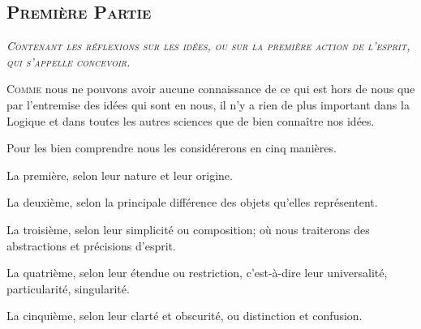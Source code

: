 \subsection{\centering \huge \scshape Première Partie}
\begin{center}\emph{\Large\scshape Contenant les réflexions sur les idées, ou sur la première action de l'esprit, qui s'appelle concevoir.}\end{center}
\lettrine{C}{omme} nous ne pouvons avoir aucune connaissance de ce qui est hors de nous que par l'entremise des idées qui sont en nous, il n'y a rien de plus important dans la Logique et dans toutes les autres sciences que de bien connaître nos idées.

Pour les bien comprendre nous les considérerons en cinq manières.

La première, selon leur nature et leur origine.

La deuxième, selon la principale différence des objets qu'elles représentent.

La troisième, selon leur simplicité ou composition; où nous traiterons des abstractions et précisions d'esprit.

La quatrième, selon leur étendue ou restriction, c'est-à-dire leur universalité, particularité, singularité.

La cinquième, selon leur clarté et obscurité, ou distinction et confusion.
